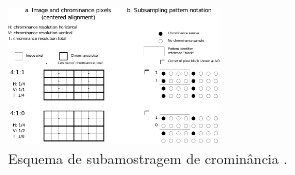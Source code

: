 \begin{frame}[allowframebreaks]
  \framebreak

  \begin{figure}[h!]
  \centering
  \includegraphics[width=0.5\textwidth]{images/chromasubsamplefig03.pdf}
  \caption{Esquema de subamostragem de crominância \citep{kerr2012}.}
  \label{fig:chromasubsamplefig03}
  \end{figure}

\end{frame}
 

